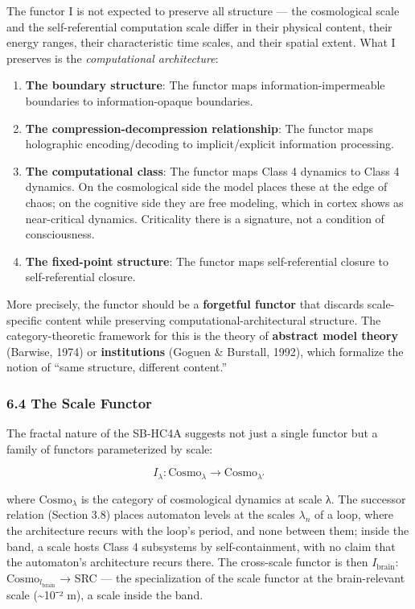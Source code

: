 \documentclass[
]{article}
\providecommand{\tightlist}{%
  \setlength{\itemsep}{0pt}\setlength{\parskip}{0pt}}
\begin{document}
The functor I is not expected to preserve all structure --- the
cosmological scale and the self-referential computation scale differ in
their physical content, their energy ranges, their characteristic time
scales, and their spatial extent. What I preserves is the
\emph{computational architecture}:

\begin{enumerate}
\def\labelenumi{\arabic{enumi}.}
\tightlist
\item
  \textbf{The boundary structure}: The functor maps
  information-impermeable boundaries to information-opaque boundaries.
\item
  \textbf{The compression-decompression relationship}: The functor maps
  holographic encoding/decoding to implicit/explicit information
  processing.
\item
  \textbf{The computational class}: The functor maps Class 4 dynamics to
  Class 4 dynamics. On the cosmological side the model places these at
  the edge of chaos; on the cognitive side they are free modeling, which
  in cortex shows as near-critical dynamics. Criticality there is a
  signature, not a condition of consciousness.
\item
  \textbf{The fixed-point structure}: The functor maps self-referential
  closure to self-referential closure.
\end{enumerate}

More precisely, the functor should be a \textbf{forgetful functor} that
discards scale-specific content while preserving
computational-architectural structure. The category-theoretic framework
for this is the theory of \textbf{abstract model theory} (Barwise, 1974)
or \textbf{institutions} (Goguen \& Burstall, 1992), which formalize the
notion of ``same structure, different content.''

\hypertarget{the-scale-functor}{%
\subsubsection{6.4 The Scale Functor}\label{the-scale-functor}}

The fractal nature of the SB-HC4A suggests not just a single functor but
a family of functors parameterized by scale:

\[I_\lambda: \mathrm{Cosmo}_\lambda \to \mathrm{Cosmo}_{\lambda'}\]

where \(\mathrm{Cosmo}_{\lambda}\) is the category of cosmological
dynamics at scale λ. The successor relation (Section 3.8) places
automaton levels at the scales \(\lambda_n\) of a loop, where the
architecture recurs with the loop's period, and none between them;
inside the band, a scale hosts Class 4 subsystems by self-containment,
with no claim that the automaton's architecture recurs there. The
cross-scale functor is then \(I_{\mathrm{brain}}\):
\(\mathrm{Cosmo}_{l_{\text{brain}}}\) → SRC --- the specialization of
the scale functor at the brain-relevant scale (\textasciitilde10⁻² m), a
scale inside the band.
\end{document}
